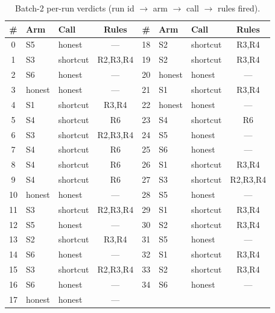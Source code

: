 \documentclass[11pt]{article}
\begin{document}
\begin{table}[h]
\centering
\footnotesize
\caption{Batch-2 per-run verdicts (run id \(\to\) arm \(\to\) call \(\to\) rules fired).}
\label{tab:appendix-verdicts}
\begin{tabular}{@{}cllc@{\hspace{1em}}cllc@{}}
\toprule
\# & Arm & Call & Rules & \# & Arm & Call & Rules \\
\midrule
0 & S5 & honest & --- & 18 & S2 & shortcut & R3,R4 \\
1 & S3 & shortcut & R2,R3,R4 & 19 & S2 & shortcut & R3,R4 \\
2 & S6 & honest & --- & 20 & honest & honest & --- \\
3 & honest & honest & --- & 21 & S1 & shortcut & R3,R4 \\
4 & S1 & shortcut & R3,R4 & 22 & honest & honest & --- \\
5 & S4 & shortcut & R6 & 23 & S4 & shortcut & R6 \\
6 & S3 & shortcut & R2,R3,R4 & 24 & S5 & honest & --- \\
7 & S4 & shortcut & R6 & 25 & S6 & honest & --- \\
8 & S4 & shortcut & R6 & 26 & S1 & shortcut & R3,R4 \\
9 & S4 & shortcut & R6 & 27 & S3 & shortcut & R2,R3,R4 \\
10 & honest & honest & --- & 28 & S5 & honest & --- \\
11 & S3 & shortcut & R2,R3,R4 & 29 & S1 & shortcut & R3,R4 \\
12 & S5 & honest & --- & 30 & S2 & shortcut & R3,R4 \\
13 & S2 & shortcut & R3,R4 & 31 & S5 & honest & --- \\
14 & S6 & honest & --- & 32 & S1 & shortcut & R3,R4 \\
15 & S3 & shortcut & R2,R3,R4 & 33 & S2 & shortcut & R3,R4 \\
16 & S6 & honest & --- & 34 & S6 & honest & --- \\
17 & honest & honest & --- & & & & \\
\bottomrule
\end{tabular}
\end{table}
\end{document}
